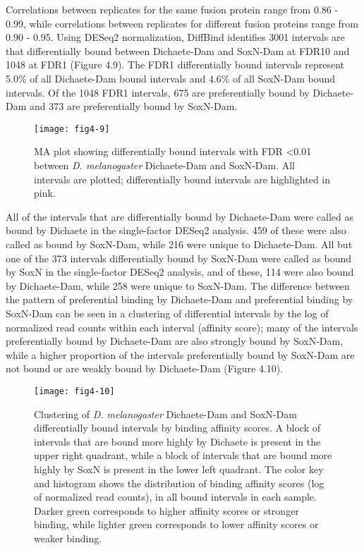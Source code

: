Correlations between replicates for the same fusion protein range from 0.86 - 0.99, while correlations between replicates for different fusion proteins range from 0.90 - 0.95. Using DESeq2 normalization, DiffBind identifies 3001 intervals are that differentially bound between Dichaete-Dam and SoxN-Dam at FDR10 and 1048 at FDR1 (Figure 4.9). The FDR1 differentially bound intervals represent 5.0\% of all Dichaete-Dam bound intervals and 4.6\% of all SoxN-Dam bound intervals. Of the 1048 FDR1 intervals, 675 are preferentially bound by Dichaete-Dam and 373 are preferentially bound by SoxN-Dam.\\

\begin{figure}
\centering
\texttt{[image: fig4-9]}
\caption{MA plot showing differentially bound intervals with FDR \textless 0.01 between \emph{D. melanogaster} Dichaete-Dam and SoxN-Dam. All intervals are plotted; differentially bound intervals are highlighted in pink.} 
\label{Figure 4.9}
\end{figure}

All of the intervals that are differentially bound by Dichaete-Dam were called as bound by Dichaete in the single-factor DESeq2 analysis. 459 of these were also called as bound by SoxN-Dam, while 216 were unique to Dichaete-Dam. All but one of the 373 intervals differentially bound by SoxN-Dam were called as bound by SoxN in the single-factor DESeq2 analysis, and of these, 114 were also bound by Dichaete-Dam, while 258 were unique to SoxN-Dam. The difference between the pattern of preferential binding by Dichaete-Dam and preferential binding by SoxN-Dam can be seen in a clustering of differential intervals by the log of normalized read counts within each interval (affinity score); many of the intervals preferentially bound by Dichaete-Dam are also strongly bound by SoxN-Dam, while a higher proportion of the intervals preferentially bound by SoxN-Dam are not bound or are weakly bound by Dichaete-Dam (Figure 4.10).\\

\begin{figure}
\centering
\texttt{[image: fig4-10]}
\caption{Clustering of \emph{D. melanogaster} Dichaete-Dam and SoxN-Dam differentially bound intervals by binding affinity scores. A block of intervals that are bound more highly by Dichaete is present in the upper right quadrant, while a block of intervals that are bound more highly by SoxN is present in the lower left quadrant. The color key and histogram shows the distribution of binding affinity scores (log of normalized read counts), in all bound intervals in each sample. Darker green corresponds to higher affinity scores or stronger binding, while lighter green corresponds to lower affinity scores or weaker binding.}
\label{Figure 4.10}
\end{figure}

